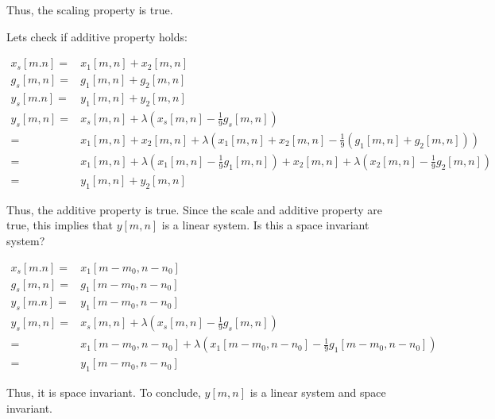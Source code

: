\documentclass[11pt]{article}
\begin{document}
\begin{flushleft}
    Thus, the scaling property is true.
\end{flushleft} 

\begin{flushleft}
Lets check if additive property holds:
\end{flushleft}   
\begin{equation*}
\begin{split}
    x_s[m.n]    =& x_1[m,n] + x_2[m,n] \\
    g_s[m,n]    =& g_1[m,n] + g_2[m,n] \\
    y_s[m.n]    =& y_1[m,n] + y_2[m,n] \\
    y_s[m,n]    =& x_s[m, n] + \lambda (x_s[m,n] - \frac{1}{9}g_s[m,n]) \\
                =& x_1[m,n] + x_2[m,n] + \lambda (x_1[m,n] + x_2[m,n] - \frac{1}{9}(g_1[m,n] + g_2[m,n])) \\
                =& x_1[m, n] + \lambda (x_1[m,n] - \frac{1}{9}g_1[m,n]) +  x_2[m, n] + \lambda (x_2[m,n] - \frac{1}{9}g_2[m,n]) \\
                =& y_1[m,n] + y_2[m,n]
\end{split}
\end{equation*}

\begin{flushleft}
    Thus, the additive property is true. 
    \newline
    \newline
    Since the scale and additive property are true, this implies that $y[m,n]$ is a linear system.
    \newline
    \newline
    Is this a space invariant system?
\end{flushleft} 
\begin{equation*}
\begin{split}
    x_s[m.n]    =& x_1[m - m_0,n - n_0]\\
    g_s[m,n]    =& g_1[m - m_0,n - n_0] \\
    y_s[m.n]    =& y_1[m - m_0,n - n_0] \\
    y_s[m,n]    =& x_s[m, n] + \lambda (x_s[m,n] - \frac{1}{9}g_s[m,n]) \\
                =& x_1[m - m_0,n - n_0] + \lambda (x_1[m - m_0,n - n_0] - \frac{1}{9}g_1[m - m_0,n - n_0]) \\
                =& y_1[m - m_0,n - n_0]
\end{split}
\end{equation*}
\begin{flushleft}
    Thus, it is  space invariant.
    \newline
    \newline
    To conclude, $y[m,n]$ is a linear system and space invariant.
\end{flushleft} 
\end{document}
